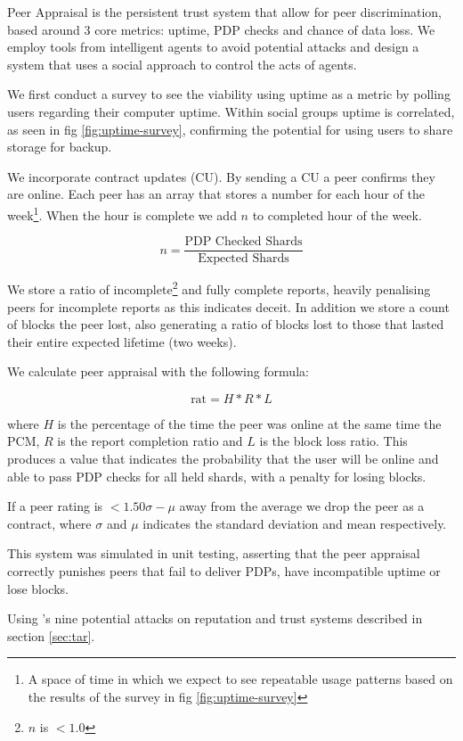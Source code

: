 \documentclass[11pt, a4paper, twocolumn, twoside]{report}
\begin{document}
Peer Appraisal is the persistent trust system that allow for peer discrimination, based around 3 core metrics: uptime, PDP checks and chance of data loss. We employ tools from intelligent agents to avoid potential attacks and design a system that uses a social approach \citep{pinyol2013computational} to control the acts of agents.

We first conduct a survey to see the viability using uptime as a metric by polling users regarding their computer uptime. Within social groups uptime is correlated, as seen in fig \ref{fig:uptime-survey}, confirming the potential for using users to share storage for backup.

We incorporate contract updates (CU). By sending a CU a peer confirms they are online. Each peer has an array that stores a number for each hour of the week\footnote{A space of time in which we expect to see repeatable usage patterns based on the results of the survey in fig \ref{fig:uptime-survey}}. When the hour is complete we add $n$ to completed hour of the week.

$$n = \frac{\mbox{PDP Checked Shards}}{\mbox{Expected Shards}}$$

We store a ratio of incomplete\footnote{$n$ is $<1.0$} and fully complete reports, heavily penalising peers for incomplete reports as this indicates deceit. In addition we store a count of blocks the peer lost, also generating a ratio of blocks lost to those that lasted their entire expected lifetime (two weeks).

We calculate peer appraisal with the following formula:

$$\mbox{rat} = H * R * L$$

where $H$ is the percentage of the time the peer was online at the same time the PCM, $R$ is the report completion ratio and $L$ is the block loss ratio. This produces a value that indicates the probability that the user will be online and able to pass PDP checks for all held shards, with a penalty for losing blocks.

If a peer rating is $<1.50\sigma - \mu$ away from the average we drop the peer as a contract, where $\sigma$ and $\mu$ indicates the standard deviation and mean respectively.

This system was simulated in unit testing, asserting that the peer appraisal correctly punishes peers that fail to deliver PDPs, have incompatible uptime or lose blocks.

Using \cite{josang2009challenges}'s nine potential attacks on reputation and trust systems described in section \ref{sec:tar}.
\end{document}
